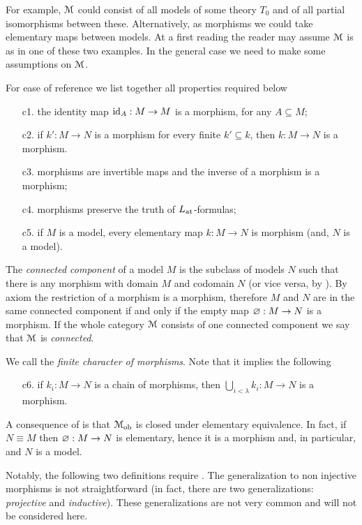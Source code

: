 \documentclass[creche.tex]{subfiles}
\begin{document}
For example, $\EuScript M$ could consist of all models of some theory $T_0$ and of all partial isomorphisms between these. Alternatively, as morphisms we could take elementary maps between models. At a first reading the reader may assume $\EuScript M$ is as in one of these two examples. In the general case we need to make some assumptions on $\EuScript M$.

\begin{definition}\label{def_com_c}For ease of reference we list together all properties required below
\begin{itemize} 
\item[c1.] the identity map $\textrm{id}_A:M\to M$ is a morphism, for any $A\subseteq M$;
\item[c2.] if $k':M\to N$ is a morphism for every finite $k'\subseteq k$, then $k:M\to N$ is a morphism.
\item[c3.] morphisms are invertible maps and the inverse of a morphism is a morphism;
\item[c4.] morphisms preserve the truth of $L_{\tiny\rm at}\hskip-.3ex$\,-formulas;
\item[c5.] if $M$ is a model, every elementary map $k:M\to N$ is morphism (and, $N$ is a model).\QED
\end{itemize}
\end{definition}

The \emph{connected component\/} of a model $M$ is the subclass of models $N$ such that there is any morphism with domain $M$ and codomain $N$ (or vice versa, by ). By axiom  the restriction of a morphism is a morphism, therefore $M$ and $N$ are in the same connected component if and only if the empty map $\varnothing:M\to N$ is a morphism. If the whole category $\EuScript M$ consists of one connected component we say that $\EuScript M$ is \emph{connected}.

We call  the \emph{finite character of morphisms}. Note that it implies the following

\begin{itemize} 
\item[c6.] if $k_i:M\to N$ is a chain of morphisms, then $\displaystyle\bigcup_{i<\lambda} k_i:M\to N$ is a morphism.
\end{itemize}

A consequence of  is that $\EuScript M_{\rm ob}$ is closed under elementary equivalence. In fact, if $N\equiv M$ then $\varnothing:M\to N$ is elementary, hence it is a morphism and, in particular, and $N$ is a model.

Notably, the following two definitions require . The generalization to non injective morphisms is not straightforward (in fact, there are two generalizations: \textit{projective\/} and \textit{inductive\/}). These generalizations are not very common and will not be considered here. 
\end{document}

